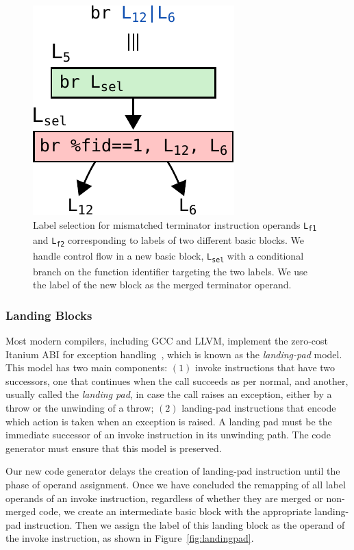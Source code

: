 \begin{figure}[t]
  \centering
  \includegraphics[scale=0.65]{src/merge-operation/figs/label-select.pdf}
  \caption{Label selection for mismatched terminator instruction operands
	\texttt{L\textsubscript{f1}} and \texttt{L\textsubscript{f2}} corresponding
	to labels of two different basic blocks. We handle control flow in a new
	basic block, \texttt{L\textsubscript{sel}} with a conditional branch on the
	function identifier targeting the two labels. We use the label of the new
	block as the merged terminator operand.}
  \label{fig:label-select}
\end{figure}

\subsubsection{Landing Blocks}

Most modern compilers, including GCC and LLVM, implement the zero-cost Itanium ABI for exception handling~\cite{dinechin00}, which is known
as the \textit{landing-pad} model. This model has two main components: $(1)$ invoke instructions that have two successors, one that
continues when the call succeeds as per normal, and another, usually called the \textit{landing pad}, in case the call raises an exception,
either by a throw or the unwinding of a throw; $(2)$ landing-pad instructions that encode which action is taken when an exception is
raised. A landing pad must be the immediate successor of an invoke instruction in its unwinding path. The code generator must ensure that
this model is preserved.

Our new code generator delays the creation of landing-pad instruction until
the phase of operand assignment.
Once we have concluded the remapping of all label operands of an invoke instruction,
regardless of whether they are merged or non-merged code, we create an
intermediate basic block with the appropriate landing-pad instruction.
Then we assign the label of this landing block as the operand of
the invoke instruction, as shown in Figure~\ref{fig:landingpad}.

